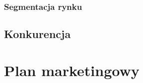 \documentclass[12pt]{article}
\begin{document}

\subsubsection{Segmentacja rynku}


\subsection{Konkurencja}


\section{Plan marketingowy}


\end{document}
